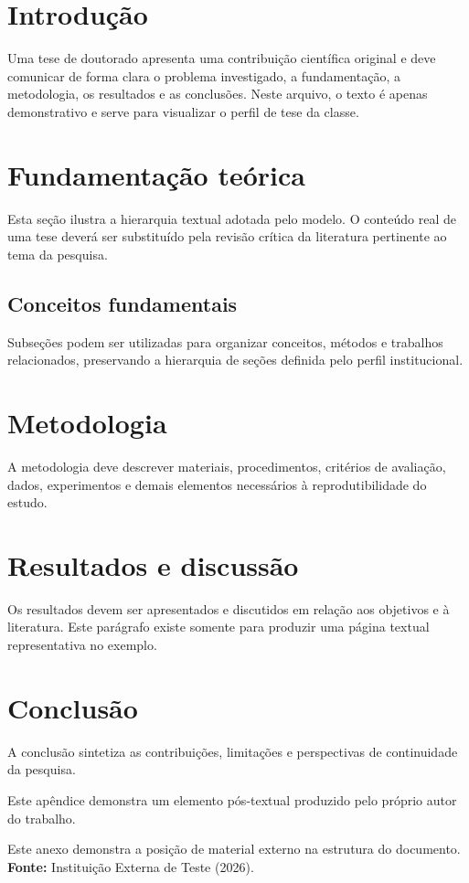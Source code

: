 \documentclass{abntexto-ufc}
\begin{document}
\pretextual
\ufcPrintCover
\ufcPrintTitlePage
\ufcPrintApprovalPage
{}
\ufcPrintTableOfContents

\textual

\section{Introdução}
Uma tese de doutorado apresenta uma contribuição científica original e deve comunicar de
forma clara o problema investigado, a fundamentação, a metodologia, os resultados e as
conclusões. Neste arquivo, o texto é apenas demonstrativo e serve para visualizar o perfil
de tese da classe.

\section{Fundamentação teórica}
Esta seção ilustra a hierarquia textual adotada pelo modelo. O conteúdo real de uma tese
deverá ser substituído pela revisão crítica da literatura pertinente ao tema da pesquisa.

\subsection{Conceitos fundamentais}
Subseções podem ser utilizadas para organizar conceitos, métodos e trabalhos relacionados,
preservando a hierarquia de seções definida pelo perfil institucional.

\section{Metodologia}
A metodologia deve descrever materiais, procedimentos, critérios de avaliação, dados,
experimentos e demais elementos necessários à reprodutibilidade do estudo.

\section{Resultados e discussão}
Os resultados devem ser apresentados e discutidos em relação aos objetivos e à literatura.
Este parágrafo existe somente para produzir uma página textual representativa no exemplo.

\section{Conclusão}
A conclusão sintetiza as contribuições, limitações e perspectivas de continuidade da pesquisa.

Este apêndice demonstra um elemento pós-textual produzido pelo próprio autor do trabalho.

Este anexo demonstra a posição de material externo na estrutura do documento.\\
\textbf{Fonte:} Instituição Externa de Teste (2026).
\end{document}
